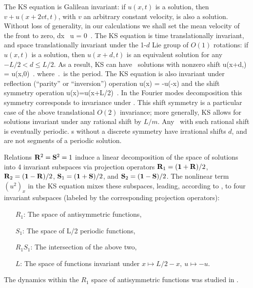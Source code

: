The  KS equation is
Galilean invariant: if $u(x,t)$ is a solution, then 
$v+u(x+2vt,t)$, with $v$ an arbitrary constant velocity, is also a solution. 
Without loss of generality, in our calculations we shall set 
the mean velocity of the  front to zero,
\beq
\int dx \, u = 0
\,.
The KS equation   is time translationally invariant,
and 
space translationally invariant
under the 1-$d$ Lie group of $O(1)$ rotations: if
$u(x,t)$ is a solution, then $u(x+d,t)$ is an equivalent
solution for any $-L/2 < d \leq L/2$.
As a result,
KS can have \rpo\ solutions with nonzero shift
\beq
u(x+d,\period{}) = u(x,0)
\,.
where $\period{}$ is the period.
The KS equation is also invariant under
reflection (``parity'' or ``inversion'') operation
\beq
\Refl u(x) = -u(-x)
and the shift symmetry operation 
\beq
\Shift u(x)=u(x+L/2)
\,. 
In the Fourier modes decomposition  this
symmetry corresponds to invariance under
.
This shift symmetry is a particular case of the
above translational $O(2)$ invariance; more generally,
KS allows for solutions invariant under any rational shift by
$L/m$. Any \rpo\ with such rational shift is eventually periodic.
\Rpo s without a discrete symmetry have irrational shifts
$d$, and are not segments of a periodic solution.


Relations $\mathbf{R}^2=\mathbf{S}^2=1$
induce a linear decomposition of the space of solutions into 4 invariant
subspaces via projection operators
$\mathbf{R}_1=(\mathbf 1+\mathbf{R})/2$,
$\mathbf{R}_2=(\mathbf 1-\mathbf{R})/2$,
$\mathbf{S}_1=(\mathbf 1+\mathbf{S})/2$, and
$\mathbf{S}_2=(\mathbf 1-\mathbf{S})/2$. The nonlinear term $(u^2)_x$ in the KS equation
mixes these subspaces, leading,
according to , to four invariant subspaces
(labeled by the corresponding projection operators):
\begin{itemize}
 \item[$R_1$:] The space of antisymmetric functions,
 \item[$S_1$:] The space of L/2 periodic functions,
 \item[$R_1 S_1$:] The intersection of the above two,
 \item[$L$:] The space of functions invariant under $x\mapsto L/2-x,\ u\mapsto -u$.
 
\end{itemize}
The dynamics within the $R_1$ space of antisymmetric functions
was studied in .

